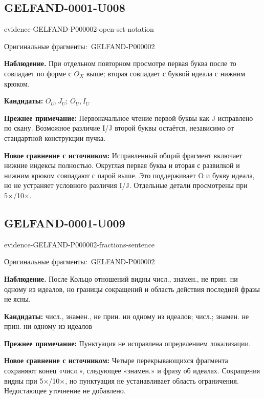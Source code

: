 \documentclass[11pt]{article}
\newcommand{\EvidenceBlock}[4]{%
 \par\smallskip\noindent\begin{minipage}{\linewidth}
 \begin{minipage}[t]{.47\linewidth}\vspace{0pt}\centering
 \csname evidence-#1-#2\endcsname\par
 {\scriptsize\SourceCropCaption\ #1}\par
 \end{minipage}\hfill
 \begin{minipage}[t]{.49\linewidth}\vspace{0pt}\raggedright
 {\small\color{orange!65!black}\textbf{#4} #3}\par
 \end{minipage}
 \end{minipage}\par\smallskip}
\newcommand{\SourceCropCaption}{Оригинальные фрагменты:}\newcommand{\ReadingCaption}{Сомнительное чтение.}\newcommand{\IncompleteCaption}{Неразобранный фрагмент.}\newcommand{\DiagramCaption}{Рисунок и набранное описание.}
\begin{document}
\subsection*{GELFAND-0001-U008}
\EvidenceBlock{GELFAND-P000002}{open-set-notation}{При отдельном повторном просмотре первая буква после то совпадает по форме с \(O_X\) выше; вторая совпадает с буквой идеала с нижним крюком.}{Наблюдение.}
\par\smallskip\noindent\textbf{Кандидаты: } \(O_U,J_U\); \(O_U,I_U\)\par
\par\smallskip\noindent\textbf{Прежнее примечание: } Первоначальное чтение первой буквы как J исправлено по скану. Возможное различие I/J второй буквы остаётся, независимо от стандартной конструкции пучка.\par
\par\smallskip\noindent\textbf{Новое сравнение с источником: } Исправленный общий фрагмент включает нижние индексы полностью. Округлая первая буква и вторая с развилкой и нижним крюком совпадают с парой выше. Это поддерживает O и букву идеала, но не устраняет условного различия I/J. Отдельные детали просмотрены при 5×/10×.\par

\subsection*{GELFAND-0001-U009}
\EvidenceBlock{GELFAND-P000002}{fractions-sentence}{После Кольцо отношений видны числ., знамен., не прин. ни одному из идеалов, но границы сокращений и область действия последней фразы не ясны.}{Наблюдение.}
\par\smallskip\noindent\textbf{Кандидаты: } числ., знамен., не прин. ни одному из идеалов; числ.; знамен. не прин. ни одному из идеалов\par
\par\smallskip\noindent\textbf{Прежнее примечание: } Пунктуация не исправлена определением локализации.\par
\par\smallskip\noindent\textbf{Новое сравнение с источником: } Четыре перекрывающихся фрагмента сохраняют конец «числ.», следующее «знамен.» и фразу об идеалах. Сокращения видны при 5×/10×, но пунктуация не устанавливает область ограничения. Недостающее уточнение не добавлено.\par
\end{document}
